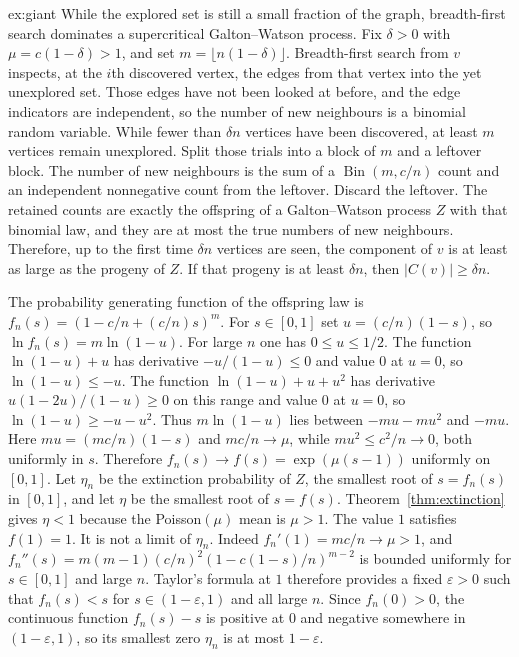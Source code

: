 \begin{solution}{ex:giant}
\idea While the explored set is still a small fraction of the graph, breadth-first search dominates a supercritical Galton--Watson process.
\writeup Fix $\delta>0$ with $\mu=c(1-\delta)>1$, and set $m=\lfloor n(1-\delta)\rfloor$. Breadth-first search from $v$ inspects, at the $i$th discovered vertex, the edges from that vertex into the yet unexplored set. Those edges have not been looked at before, and the edge indicators are independent, so the number of new neighbours is a binomial random variable. While fewer than $\delta n$ vertices have been discovered, at least $m$ vertices remain unexplored. Split those trials into a block of $m$ and a leftover block. The number of new neighbours is the sum of a $\operatorname{Bin}(m,c/n)$ count and an independent nonnegative count from the leftover. Discard the leftover. The retained counts are exactly the offspring of a Galton--Watson process $Z$ with that binomial law, and they are at most the true numbers of new neighbours. Therefore, up to the first time $\delta n$ vertices are seen, the component of $v$ is at least as large as the progeny of $Z$. If that progeny is at least $\delta n$, then $|C(v)|\ge\delta n$.

The probability generating function of the offspring law is $f_n(s)=(1-c/n+(c/n)s)^m$. For $s\in[0,1]$ set $u=(c/n)(1-s)$, so $\ln f_n(s)=m\ln(1-u)$. For large $n$ one has $0\le u\le1/2$. The function $\ln(1-u)+u$ has derivative $-u/(1-u)\le0$ and value $0$ at $u=0$, so $\ln(1-u)\le -u$. The function $\ln(1-u)+u+u^2$ has derivative $u(1-2u)/(1-u)\ge0$ on this range and value $0$ at $u=0$, so $\ln(1-u)\ge -u-u^2$. Thus $m\ln(1-u)$ lies between $-mu-mu^2$ and $-mu$. Here $mu=(mc/n)(1-s)$ and $mc/n\to\mu$, while $mu^2\le c^2/n\to0$, both uniformly in $s$. Therefore $f_n(s)\to f(s)=\exp(\mu(s-1))$ uniformly on $[0,1]$. Let $\eta_n$ be the extinction probability of $Z$, the smallest root of $s=f_n(s)$ in $[0,1]$, and let $\eta$ be the smallest root of $s=f(s)$. Theorem~\ref{thm:extinction} gives $\eta<1$ because the Poisson$(\mu)$ mean is $\mu>1$. The value $1$ satisfies $f(1)=1$. It is not a limit of $\eta_n$. Indeed $f_n'(1)=mc/n\to\mu>1$, and $f_n''(s)=m(m-1)(c/n)^2(1-c(1-s)/n)^{m-2}$ is bounded uniformly for $s\in[0,1]$ and large $n$. Taylor's formula at $1$ therefore provides a fixed $\varepsilon>0$ such that $f_n(s)<s$ for $s\in(1-\varepsilon,1)$ and all large $n$. Since $f_n(0)>0$, the continuous function $f_n(s)-s$ is positive at $0$ and negative somewhere in $(1-\varepsilon,1)$, so its smallest zero $\eta_n$ is at most $1-\varepsilon$.


\end{solution}
